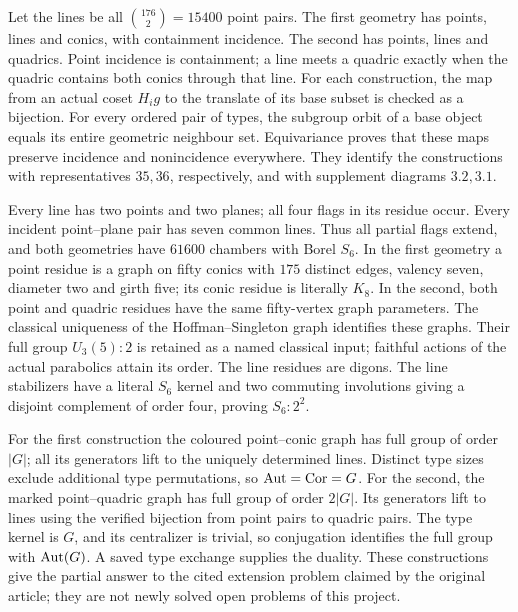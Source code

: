 Let the lines be all $\binom{176}{2}=15400$ point pairs. The first
geometry has points, lines and conics, with containment incidence.
The second has points, lines and quadrics. Point incidence is containment;
a line meets a quadric exactly when the quadric contains both conics
through that line. For each construction, the map from an actual coset
$H_i g$ to the translate of its base subset is checked as a bijection.
For every ordered pair of types, the subgroup orbit of a base object
equals its entire geometric neighbour set. Equivariance proves that
these maps preserve incidence and nonincidence everywhere. They identify
the constructions with representatives $35,36$, respectively, and with
supplement diagrams $3.2,3.1$.

Every line has two points and two planes; all four flags in its residue
occur. Every incident point--plane pair has seven common lines. Thus all
partial flags extend, and both geometries have $61600$ chambers with
Borel $S_6$. In the first geometry a point residue is a graph on fifty
conics with $175$ distinct edges, valency seven, diameter two and girth
five; its conic residue is literally $K_8$. In the second, both point
and quadric residues have the same fifty-vertex graph parameters.
The classical uniqueness of the Hoffman--Singleton graph identifies
these graphs. Their full group $U_3(5):2$ is retained as a named
classical input; faithful actions of the actual parabolics attain its
order. The line residues are digons. The line stabilizers have a
literal $S_6$ kernel and two commuting involutions giving a disjoint
complement of order four, proving $S_6:2^2$.

For the first construction the coloured point--conic graph has full
group of order $|G|$; all its generators lift to the uniquely determined
lines. Distinct type sizes exclude additional type permutations, so
$\operatorname{Aut}=\operatorname{Cor}=G$. For the second, the marked point--quadric graph has
full group of order $2|G|$. Its generators lift to lines using the
verified bijection from point pairs to quadric pairs. The type kernel
is $G$, and its centralizer is trivial, so conjugation identifies the
full group with $\operatorname{Aut}(G)$. A saved type exchange supplies the duality.
These constructions give the partial answer to the cited extension
problem claimed by the original article; they are not newly solved
open problems of this project.

